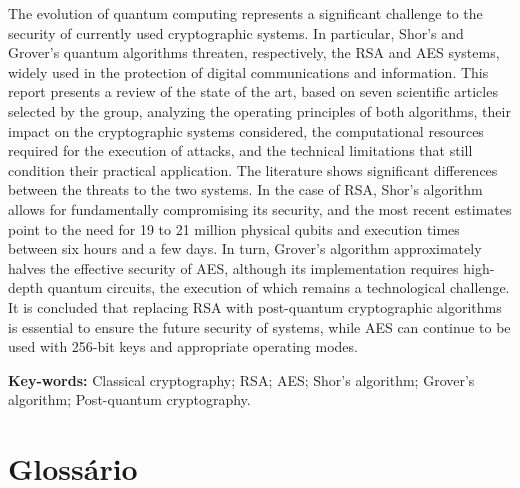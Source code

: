 \documentclass[11pt,a4paper]{article}
\begin{document}
The evolution of quantum computing represents a significant challenge to the security of currently used cryptographic systems. In particular, Shor's and Grover's quantum algorithms threaten, respectively, the RSA and AES systems, widely used in the protection of digital communications and information. This report presents a review of the state of the art, based on seven scientific articles selected by the group, analyzing the operating principles of both algorithms, their impact on the cryptographic systems considered, the computational resources required for the execution of attacks, and the technical limitations that still condition their practical application. The literature shows significant differences between the threats to the two systems. In the case of RSA, Shor's algorithm allows for fundamentally compromising its security, and the most recent estimates point to the need for 19 to 21 million physical qubits and execution times between six hours and a few days. In turn, Grover's algorithm approximately halves the effective security of AES, although its implementation requires high-depth quantum circuits, the execution of which remains a technological challenge. It is concluded that replacing RSA with post-quantum cryptographic algorithms is essential to ensure the future security of systems, while AES can continue to be used with 256-bit keys and appropriate operating modes.

\vspace{6pt}
\noindent\textbf{Key-words:} Classical cryptography; RSA; AES; Shor's algorithm; Grover's algorithm; Post-quantum cryptography.


\clearpage

\tableofcontents
\clearpage

\section*{Glossário}
\end{document}
